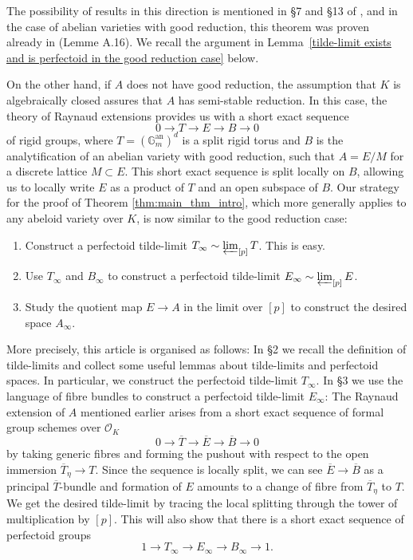 \documentclass[10pt,oneside]{amsart}
\theoremstyle{definition}
\renewcommand{\O}{\mathcal{O}}
\begin{document}
The possibility of results in this direction is mentioned in \S 7 and \S 13 of \cite{scholzeICMproceedings}, and in the case of abelian varieties with good reduction, this theorem was proven already in \cite[Lemme~A.16]{Pilloni-Stroh} (Lemme A.16). We recall the argument in Lemma~\ref{tilde-limit exists and is perfectoid in the good reduction case} below. 

On the other hand, if $A$ does not have good reduction, the assumption that $K$ is algebraically closed assures that $A$ has semi-stable reduction.
In this case, the theory of Raynaud extensions provides us with a short exact sequence 
\[ 0 \rightarrow T \rightarrow E  \rightarrow  B  \rightarrow  0\]
of rigid groups, where $T = (\mathbb G_m^{\text{an}})^{d}$ is a split rigid torus and $B$ is the analytification of an abelian variety with good reduction, such that $A = E/M$ for a discrete lattice $M \subset E$. This short exact sequence is split locally on $B$, allowing us to locally write $E$ as a product of $T$ and an open subspace of $B$.
Our strategy for the proof of Theorem \ref{thm:main_thm_intro}, which more generally applies to any abeloid variety over $K$, is now similar to the good reduction case:
\begin{enumerate}
\item Construct a perfectoid tilde-limit $T_\infty\sim\varprojlim_{[p]} T$. This is easy.
\item Use $T_\infty$ and $B_\infty$ to construct a perfectoid tilde-limit $E_\infty\sim\varprojlim_{[p]} E$.
\item Study the quotient map $E\rightarrow A$ in the limit over $[p]$ to construct the desired space $A_\infty$.
\end{enumerate}

More precisely, this article is organised as follows: In \S2 we recall the definition of tilde-limits and collect some useful lemmas about tilde-limits and perfectoid spaces. In particular, we construct the perfectoid tilde-limit $T_\infty$. In \S3 we use the language of fibre bundles to construct a perfectoid tilde-limit $E_\infty$: The Raynaud extension of $A$ mentioned earlier arises from a short exact sequence of formal group schemes over $\O_K$
\[0\rightarrow \overline{T}\rightarrow \overline{E}\rightarrow \overline{B}\rightarrow 0\]
by taking generic fibres and forming the pushout with respect to the open immersion $\overline{T}_\eta\rightarrow T$. Since the sequence is locally split, we can see $\overline{E}\rightarrow \overline{B}$ as a principal $\overline{T}$-bundle and formation of $E$ amounts to a change of fibre from $\overline{T}_\eta$ to $T$. We get the desired tilde-limit by tracing the local splitting through the tower of multiplication by $[p]$. This will also show that there is a short exact sequence of perfectoid groups
\[ 1\to T_\infty \to E_\infty \to B_\infty \to 1.\]
\end{document}
